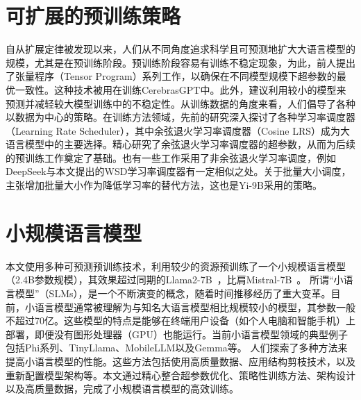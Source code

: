 \section{可扩展的预训练策略}

自从扩展定律\citep{hestness2017deep, kaplan2020scaling, rae2021scaling, aghajanyan2023scaling}被发现以来，人们从不同角度追求科学且可预测地\citep{achiam2023gpt,hu2023unlock, du2024understanding}扩大大语言模型的规模，尤其是在预训练阶段。预训练阶段容易有训练不稳定现象，为此，前人提出了张量程序（Tensor Program）系列工作\citep{yang2022tensor, yang2023tensor}，以确保在不同模型规模下超参数的最优一致性。这种技术被用在训练CerebrasGPT\citep{dey2023cerebras}中。此外，\citet{wortsman2023small}建议利用较小的模型来预测并减轻较大模型训练中的不稳定性。从训练数据的角度来看，人们倡导了各种以数据为中心的策略\citep{xie2024doremi, shi2023context, ye2024data}。在训练方法领域，先前的研究深入探讨了各种学习率调度器（Learning Rate Scheduler）\citep{howard2018universal, raffel2020exploring, hundt2019sharpdarts}，其中余弦退火学习率调度器（Cosine LRS）\citep{loshchilov2016sgdr}成为大语言模型中的主要选择。\citet{kaplan2020scaling,hoffmann2022training}精心研究了余弦退火学习率调度器的超参数，从而为后续的预训练工作奠定了基础。也有一些工作采用了非余弦退火学习率调度，例如DeepSeek\citep{bi2024deepseek}与本文提出的WSD学习率调度器有一定相似之处。关于批量大小调度，\citet{smith2017don}主张增加批量大小作为降低学习率的替代方法，这也是Yi-9B\citep{young2024yi}采用的策略。

\section{小规模语言模型}

本文使用多种可预测预训练技术，利用较少的资源预训练了一个小规模语言模型 （2.4B参数规模），其效果超过同期的Llama2-7B~\cite{touvron2023llama2}，比肩Mistral-7B~\cite{jiang2023mistral}。
所谓“小语言模型”（SLMs），是一个不断演变的概念，随着时间推移经历了重大变革。目前，小语言模型通常被理解为与知名大语言模型相比规模较小的模型，其参数一般不超过70亿。这些模型的特点是能够在终端用户设备（如个人电脑和智能手机）上部署，即便没有图形处理器（GPU）也能运行。当前小语言模型领域的典型例子包括Phi系列\citep{gunasekar2023textbooks, li2023textbooks, Javaheripi2023Phi2}、TinyLlama\citep{zhang2024tinyllama}、MobileLLM\citep{liu2024mobilellm}以及Gemma\citep{Banks2024Gemma}等。 人们探索了多种方法来提高小语言模型的性能。这些方法包括使用高质量数据\citep{gunasekar2023textbooks, li2023textbooks, Javaheripi2023Phi2}、应用结构剪枝技术\citep{xia2023sheared}，以及重新配置模型架构\citep{liu2024mobilellm}等。本文通过精心整合超参数优化、策略性训练方法、架构设计以及高质量数据，完成了小规模语言模型的高效训练。


